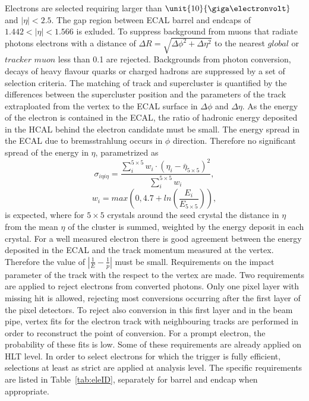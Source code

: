 Electrons are selected requiring \pt larger than $\unit{10}{\giga\electronvolt}$ and $|\eta| < 2.5$. The gap region between ECAL barrel and endcaps of $1.442 < |\eta| < 1.566$ is exluded. To suppress background from muons that radiate photons electrons with a distance of $\Delta R = \sqrt{\Delta\phi^2 + \Delta \eta^2}$ to the nearest $\textit{global}$ or $\textit{tracker muon}$ less than 0.1 are rejected. Backgrounds from photon conversion, decays of heavy flavour quarks  or charged hadrons are suppressed by a set of selection criteria. The matching of track and supercluster is quantified by the differences between the supercluster position and the parameters of the track extraploated from the vertex to the ECAL surface in $\Delta\phi$ and $\Delta\eta$. As the energy of the electron is contained in the ECAL, the ratio of hadronic energy deposited in the HCAL behind the electron candidate must be small. The energy spread in the ECAL due to bremsstrahlung occurs in $\phi$ direction. Therefore no significant spread of the energy in $\eta$, parametrized as
\begin{equation}
\sigma_{i\eta i\eta} = \frac{\sum\limits_i^{5\times 5} w_i\cdot (\eta_i - \bar{\eta}_{5\times 5})^2}{\sum\limits_{i}^{5\times 5} w_i},
\end{equation}
\begin{equation}
w_i = max(0,4.7 + ln(\frac{E_i}{E_{5 \times 5}})),
\end{equation}
is expected, where for $5\times 5$ crystals around the seed crystal the distance in $\eta$ from the mean $\eta$ of the cluster is summed, weighted by the energy deposit in each crystal. For a well measured electron there is good agreement between the energy deposited in the ECAL and the track momentum measured at the vertex. Therefore the value of $| \frac{1}{E} - \frac{1}{p}|$ must be small. Requirements on the impact parameter of the track with the respect to the vertex are made. Two requirements are applied to reject electrons from converted photons. Only one pixel layer with missing hit is allowed, rejecting most conversions occurring after the first layer of the pixel detectors. To reject also conversion in this first layer and in the beam pipe, vertex fits for the electron track with neighbouring tracks are performed in order to reconstruct the point of conversion. For a prompt electron, the probability of these fits is low. Some of these requirements are already applied on HLT level. In order to select electrons for which the trigger is fully efficient, selections at least as strict are applied at analysis level. The specific requirements are listed in Table~\ref{tab:eleID}, separately for barrel and endcap when appropriate. 
